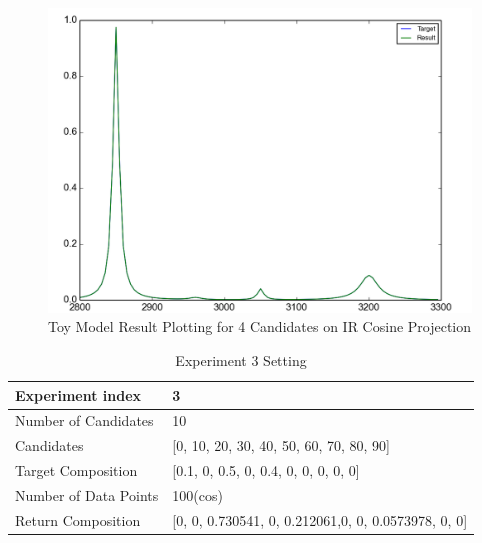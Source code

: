 \begin{figure}[!ht] \label{fig:3.2}
\centering
\includegraphics[scale=0.3]{Figures/toy_model_result_plotting_ir_cos_4candi_1.png}
\caption{Toy Model Result Plotting for 4 Candidates on IR Cosine Projection}
\end{figure}

\begin{table} \label{tab:3.2}
\begin{center}
\begin{tabular}{| l | p{7cm} | }
\hline
Experiment index & 3  \\
\hline
Number of Candidates & 10   \\
\hline
Candidates & [0, 10, 20, 30, 40, 50, 60, 70, 80, 90]  \\
\hline
Target Composition & [0.1, 0, 0.5, 0, 0.4, 0, 0, 0, 0, 0] \\
\hline
Number of Data Points & 100(cos) \\
\hline
Return Composition & [0, 0, 0.730541, 0, 0.212061,0, 0, 0.0573978, 0, 0] \\
\hline
\end{tabular}
\end{center}
\caption{Experiment 3 Setting}
\end{table}	


